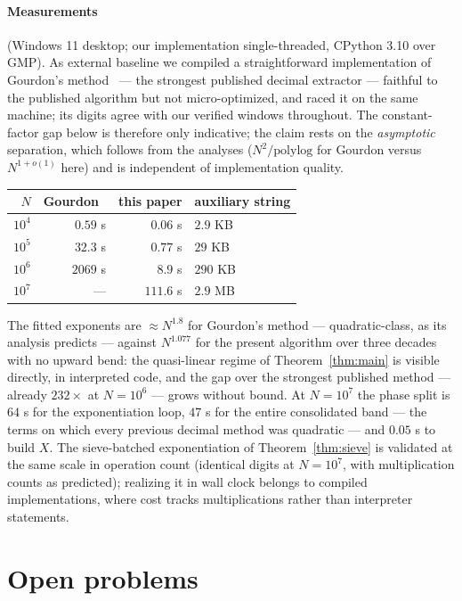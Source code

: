 \documentclass[11pt]{article}
\theoremstyle{remark}
\theoremstyle{definition}
\begin{document}
\paragraph{Measurements} (Windows 11 desktop; our implementation
single-threaded, CPython 3.10 over GMP). As external baseline we compiled a
straightforward implementation of Gourdon's method~\cite{Gourdon03} --- the
strongest published decimal extractor --- faithful to the published algorithm
but not micro-optimized, and raced it on the same machine; its digits agree
with our verified windows throughout. The constant-factor gap below is
therefore only indicative; the claim rests on the \emph{asymptotic} separation,
which follows from the analyses ($N^{2}/\mathrm{polylog}$ for Gourdon versus
$N^{1+o(1)}$ here) and is independent of implementation quality.

\begin{center}
\begin{tabular}{rrrl}
\toprule
$N$ & Gourdon~\cite{Gourdon03} & this paper & auxiliary string\\
\midrule
$10^{4}$ & $0.59$ s & $0.06$ s & $2.9$ KB\\
$10^{5}$ & $32.3$ s & $0.77$ s & $29$ KB\\
$10^{6}$ & $2069$ s & $8.9$ s & $290$ KB\\
$10^{7}$ & --- & $111.6$ s & $2.9$ MB\\
\bottomrule
\end{tabular}
\end{center}

The fitted exponents are $\approx N^{1.8}$ for Gourdon's method ---
quadratic-class, as its analysis predicts --- against $N^{1.077}$ for
the present algorithm over three decades with no upward bend: the
quasi-linear regime of Theorem~\ref{thm:main} is visible directly, in
interpreted code, and the gap over the strongest published method ---
already $232\times$ at $N=10^{6}$ --- grows without bound. At
$N=10^{7}$ the phase split is $64$ s for the exponentiation loop, $47$ s
for the entire consolidated band --- the terms on which every previous
decimal method was quadratic --- and $0.05$ s to build $X$. The
sieve-batched exponentiation of Theorem~\ref{thm:sieve} is validated at
the same scale in operation count (identical digits at $N=10^{7}$, with
multiplication counts as predicted); realizing it in wall clock belongs
to compiled implementations, where cost tracks multiplications rather
than interpreter statements.

\section{Open problems}
\end{document}
